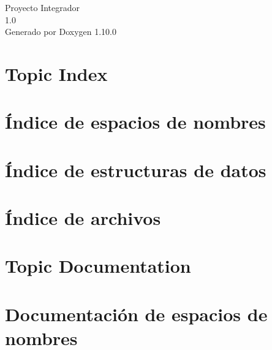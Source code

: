 \documentclass[twoside]{book}
\newcommand{\+}{\discretionary{\mbox{\scriptsize$\hookleftarrow$}}{}{}}
\newcommand{\clearemptydoublepage}{%
    \newpage{\pagestyle{empty}\cleardoublepage}%
  }
\begin{document}
  \raggedbottom
    \hypersetup{pageanchor=false,
                bookmarksnumbered=true,
                pdfencoding=unicode
               }
  \begin{titlepage}
  \vspace*{7cm}
  \begin{center}%
  {\Large Proyecto Integrador}\\
  [1ex]\large 1.\+0 \\
  \vspace*{1cm}
  {\large Generado por Doxygen 1.10.0}\\
  \end{center}
  \end{titlepage}
  \clearemptydoublepage
  \tableofcontents
  \clearemptydoublepage
  \hypersetup{pageanchor=true}



\chapter{Topic Index}

\chapter{Índice de espacios de nombres}

\chapter{Índice de estructuras de datos}

\chapter{Índice de archivos}

\chapter{Topic Documentation}

\chapter{Documentación de espacios de nombres}

\end{document}
